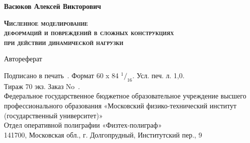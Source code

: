 \begin{center} \end{center}

\vspace{24em}

\begin{center}
\textbf{Васюков Алексей Викторович}
\end{center}

\vspace{1em}

\begin{center}
\textsc{\textbf{Численное моделирование\\
деформаций и повреждений в сложных конструкциях\\
при действии динамической нагрузки}}
\end{center}

\vspace{0.5em}

\begin{center}
Автореферат
\end{center}

\vspace{0.5em}

\begin{center}
\begin{singlespace}
Подписано в печать\ \underline{\hspace{30 mm}}. Формат 60 x 84 $^1/_{16}$. Усл. печ. л. 1,0.\\
Тираж 70 экз. Заказ No\ \underline{\hspace{10 mm}}.\\
Федеральное государственное бюджетное образовательное учреждение высшего профессионального образования «Московский физико-технический
институт (государственный университет)»\\
Отдел оперативной полиграфии «Физтех-полиграф»\\
141700, Московская обл., г. Долгопрудный, Институтский пер., 9
\end{singlespace}
\end{center}
